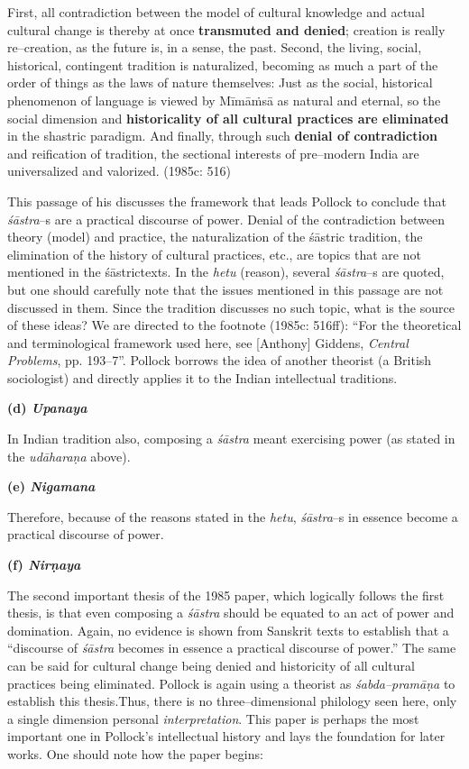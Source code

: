 \begin{myquote}
First, all contradiction between the model of cultural knowledge and actual cultural change is thereby at once \textbf{transmuted and denied}; creation is really re–creation, as the future is, in a sense, the past. Second, the living, social, historical, contingent tradition is naturalized, becoming as much a part of the order of things as the laws of nature themselves: Just as the social, historical phenomenon of language is viewed by Mīmāṁsā as natural and eternal, so the social dimension and \textbf{historicality of all cultural practices are eliminated} in the shastric paradigm. And finally, through such \textbf{denial of contradiction} and reification of tradition, the sectional interests of pre–modern India are universalized and valorized. (1985c: 516)
\end{myquote}

This passage of his discusses the framework that leads Pollock to conclude that\textit{ śāstra}–s are a practical discourse of power. Denial of the contradiction between theory (model) and practice, the naturalization of the śāstric tradition, the elimination of the history of cultural practices, etc., are topics that are not mentioned in the śāstrictexts. In the \textit{hetu} (reason), several \textit{śāstra}–s are quoted, but one should carefully note that the issues mentioned in this passage are not discussed in them. Since the tradition discusses no such topic, what is the source of these ideas? We are directed to the footnote (1985c: 516ff): “For the theoretical and terminological framework used here, see [Anthony] Giddens, \textit{Central Problems}, pp. 193–7”. Pollock borrows the idea of another theorist (a British sociologist) and directly applies it to the Indian intellectual traditions.

\textbf{(d) \textit{Upanaya}}

In Indian tradition also, composing a \textit{śāstra }meant exercising power (as stated in the \textit{udāharaṇa} above).

\textbf{(e) \textit{Nigamana}}

Therefore, because of the reasons stated in the \textit{hetu}, \textit{śāstra}–s in essence become a practical discourse of power.

\textbf{(f) \textit{Nirṇaya}}

The second important thesis of the 1985 paper, which logically follows the first thesis, is that even composing a \textit{śāstra} should be equated to an act of power and domination. Again, no evidence is shown from Sanskrit texts to establish that a “discourse of \textit{śāstra} becomes in essence a practical discourse of power.” The same can be said for cultural change being denied and historicity of all cultural practices being eliminated. Pollock is again using a theorist as \textit{śabda–pramāṇa} to establish this thesis.Thus, there is no three–dimensional philology seen here, only a single dimension personal \textit{interpretation}. This paper is perhaps the most important one in Pollock’s intellectual history and lays the foundation for later works. One should note how the paper begins:

